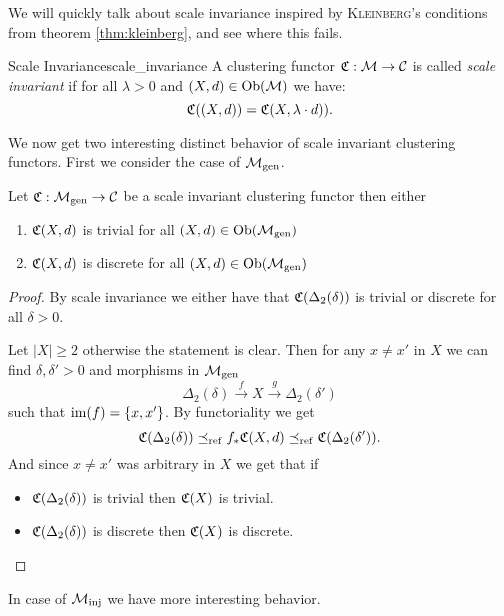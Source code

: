 We will quickly talk about scale invariance inspired by \textsc{Kleinberg}'s conditions from theorem \ref{thm:kleinberg}, and see where this fails. \source

\begin{definition}{Scale Invariance}{scale_invariance}
    A clustering functor $\mathfrak{C}: \mathcal{M} \to \mathcal{C}$ is called \emph{scale invariant} if for all $\lambda > 0$ and $(X,d) \in \mathrm {Ob}(\mathcal{M})$ we have:
    \begin{equation*}
        \mathfrak{C}((X,d)) = \mathfrak{C}(X,\lambda \cdot d)).
    \end{equation*}
\end{definition}

We now get two interesting distinct behavior of scale invariant clustering functors. First we consider the case of ${\mathcal{M}_\mathrm{gen}}$.

\begin{proposition}{}{}
    Let $\mathfrak{C}: {\mathcal{M}_\mathrm{gen}} \to \mathcal{C}$ be a scale invariant clustering functor then either
    \begin{enumerate}
        \item $\mathfrak{C}(X,d)$ is trivial for all $(X,d) \in \mathrm {Ob}({\mathcal{M}_\mathrm{gen}})$
        \item $\mathfrak{C}(X,d)$ is discrete for all $(X,d) \in \mathrm {Ob}({\mathcal{M}_\mathrm{gen}})$
    \end{enumerate}
\end{proposition}

\begin{proof}
    \source[]
    By scale invariance we either have that $\mathfrak{C}(\Delta_2(\delta))$ is trivial or discrete for all $\delta > 0$.

    Let $|X| \ge 2$ otherwise the statement is clear. Then for any $x \neq x'$ in $X$ we can find $\delta, \delta' > 0$ and morphisms in ${\mathcal{M}_\mathrm{gen}}$
    $$
    \Delta_2(\delta) \overset{f}\longrightarrow X \overset{g}\longrightarrow \Delta_2(\delta')
    $$
    such that $\operatorname*{im}(f) = \{x, x'\}$. By functoriality we get
    $$
    \mathfrak{C}(\Delta_2(\delta)) \preceq_\mathrm{ref} f_*\mathfrak{C}(X,d) \preceq_\mathrm{ref} \mathfrak{C}(\Delta_2(\delta')).
    $$
    And since $x \neq x'$ was arbitrary in $X$ we get that if
    \begin{itemize}
        \item $\mathfrak{C}(\Delta_2(\delta))$ is trivial then $\mathfrak{C}(X)$ is trivial.
        \item $\mathfrak{C}(\Delta_2(\delta))$ is discrete then $\mathfrak{C}(X)$ is discrete.
    \end{itemize}
\end{proof}

In case of ${\mathcal{M}_\mathrm{inj}}$ we have more interesting behavior.

